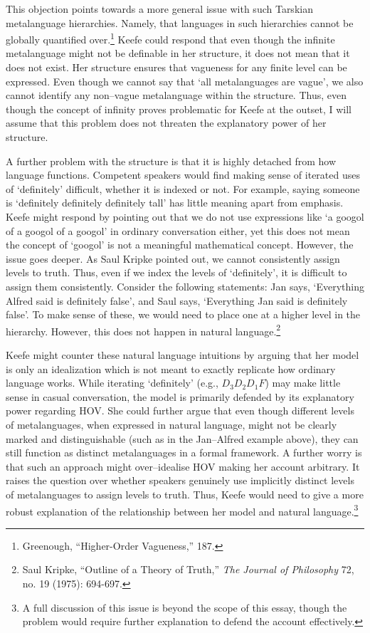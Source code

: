 This objection points towards a more general issue with such Tarskian
metalanguage hierarchies. Namely, that languages in such hierarchies
cannot be globally quantified over.\footnote{Greenough, ``Higher-Order
  Vagueness,'' 187.} Keefe could respond that even though the infinite
metalanguage might not be definable in her structure, it does not mean
that it does not exist. Her structure ensures that vagueness for any
finite level can be expressed. Even though we cannot say that `all
metalanguages are vague', we also cannot identify any non--vague
metalanguage within the structure. Thus, even though the concept of
infinity proves problematic for Keefe at the outset, I will assume that
this problem does not threaten the explanatory power of her structure.

A further problem with the structure is that it is highly detached from
how language functions. Competent speakers would find making sense of
iterated uses of `definitely' difficult, whether it is indexed or not.
For example, saying someone is `definitely definitely definitely tall'
has little meaning apart from emphasis. Keefe might respond by pointing
out that we do not use expressions like `a googol of a googol of a
googol' in ordinary conversation either, yet this does not mean the
concept of `googol' is not a meaningful mathematical concept. However,
the issue goes deeper. As Saul Kripke pointed out, we cannot
consistently assign levels to truth. Thus, even if we index the levels
of `definitely', it is difficult to assign them consistently. Consider
the following statements: Jan says, `Everything Alfred said is
definitely false', and Saul says, `Everything Jan said is definitely
false'. To make sense of these, we would need to place one at a higher
level in the hierarchy. However, this does not happen in natural
language.\footnote{Saul Kripke, ``Outline of a Theory of Truth,''
  \emph{The Journal of Philosophy} 72, no. 19 (1975): 694-697.}

Keefe might counter these natural language intuitions by arguing that
her model is only an idealization which is not meant to exactly
replicate how ordinary language works. While iterating `definitely'
(e.g., \(D_{3}D_{2}D_{1}F\)) may make little sense in casual
conversation, the model is primarily defended by its explanatory power
regarding HOV. She could further argue that even though different levels
of metalanguages, when expressed in natural language, might not be
clearly marked and distinguishable (such as in the Jan--Alfred example
above), they can still function as distinct metalanguages in a formal
framework. A further worry is that such an approach might over--idealise
HOV making her account arbitrary. It raises the question over whether
speakers genuinely use implicitly distinct levels of metalanguages to
assign levels to truth. Thus, Keefe would need to give a more robust
explanation of the relationship between her model and natural
language.\footnote{A full discussion of this issue is beyond the scope
  of this essay, though the problem would require further explanation to
  defend the account effectively.}

